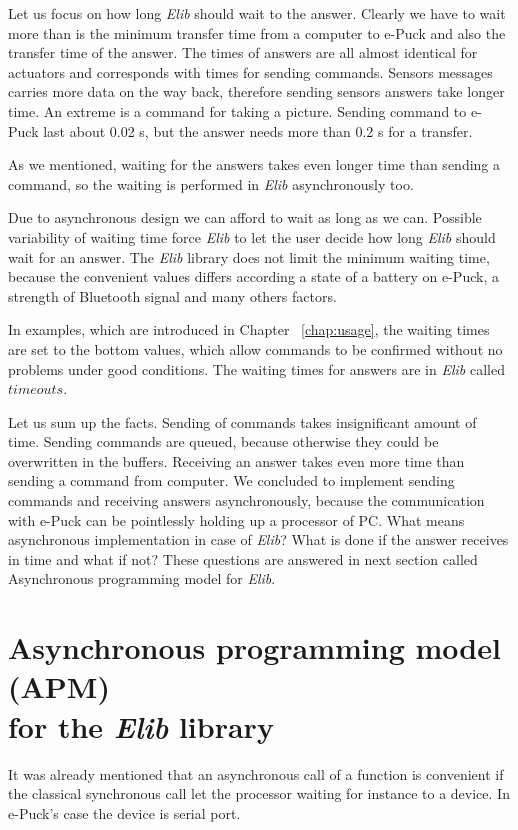 \documentclass[12pt,notitlepage]{report}
\begin{document}
	Let us focus on how long {\it Elib} should wait to the answer.
	Clearly we have to wait more than is the minimum transfer time from a computer to e-Puck and also
	the transfer time of the answer.
	The times of answers are all almost identical for actuators and corresponds with times for sending commands.
	Sensors messages carries more data on the way back, therefore sending sensors answers take longer time.
	An extreme is a command for taking a picture. Sending command to e-Puck last about 0.02 s, but
	the answer needs more than 0.2 s for a transfer.
	 
	As we mentioned, waiting for the answers takes even longer time than sending a command,
	so the waiting is performed in {\it Elib} asynchronously too.
	 
	Due to asynchronous design we can afford to wait as long as we can. 
	Possible variability of waiting time force {\it Elib} to let the user decide how long
	 {\it Elib} should wait for an answer. The {\it Elib} library does not limit the minimum waiting time,
	because the convenient values differs according a state of a battery on e-Puck, a strength of Bluetooth signal
	and many others factors. 
	
	In examples, which are introduced in Chapter ~\ref{chap:usage}, the waiting times are set to the bottom values,
	which allow commands to be confirmed without no problems under good conditions.
	The waiting times for answers are in {\it Elib} called $timeouts$.
	 
	Let us sum up the facts. Sending of commands takes insignificant amount of time.
	Sending commands are queued, because otherwise they could be overwritten in the buffers.
	Receiving an answer takes even more time than sending a command from computer.
	We concluded to implement sending commands and receiving answers asynchronously, because the communication with e-Puck
	can be pointlessly holding up a processor of PC.
	What means asynchronous implementation in case of {\it Elib}? What is done if the answer receives in time
	and what if not? These questions are answered in next section called Asynchronous programming model for {\it Elib}.
\section{Asynchronous programming model (APM)\\ for the {\it Elib} library}
	\label{sec:apm}
	It was already mentioned that an asynchronous call of a function is convenient if the
	classical synchronous call let the processor waiting for instance to a device.
	In e-Puck's case the device is serial port. 
	 
\end{document}
